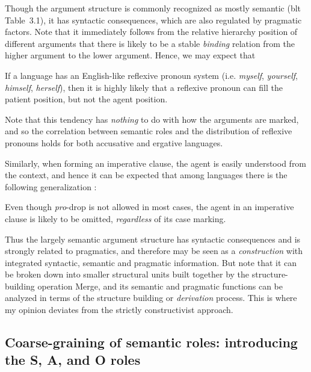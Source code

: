 \documentclass{article}
\newcommand*{\citesec}[1]{\S~{#1}}
\newcommand*{\citetable}[1]{Table~{#1}}
\newcommand*{\term}[1]{\emph{#1}}
\begin{document}
Though the argument structure is commonly recognized as mostly semantic 
(\ac{blt} \citetable{3.1}), 
it has syntactic consequences, which are also regulated by pragmatic factors.
Note that it immediately follows from the relative hierarchy position of different arguments
that there is likely to be a stable \emph{binding} relation from the higher argument to the lower argument.
Hence, we may expect that 
\begin{exe}
    \ex \label{ex:argument-binding} If a language has an English-like reflexive pronoun system
    (i.e. \term{myself}, \term{yourself}, \term{himself}, \term{herself}),
    then it is highly likely that a reflexive pronoun can fill the patient position,
    but not the agent position.
\end{exe}
Note that this tendency has \emph{nothing} to do with how the arguments are marked, 
and so the correlation between semantic roles and the distribution of reflexive pronouns holds 
for both accusative and ergative languages.

Similarly, when forming an imperative clause, 
the agent is easily understood from the context, 
and hence it can be expected that among languages there is the following generalization
\citep[\citesec{5.4}]{comrie1989language}:
\begin{exe}
    \ex \label{ex:argument-imperative} Even though \textit{pro}-drop is not allowed in most cases,
    the agent in an imperative clause is likely to be omitted,
    \emph{regardless} of its case marking.
\end{exe}

Thus the largely semantic argument structure has syntactic consequences and is strongly related to pragmatics,
and therefore may be seen as a \emph{construction} with integrated syntactic, semantic and pragmatic information.
But note that it can be broken down into smaller structural units built together 
by the structure-building operation Merge, 
and its semantic and pragmatic functions can be analyzed 
in terms of the structure building or \emph{derivation} process.
This is where my opinion deviates from the strictly constructivist approach.

\subsection{Coarse-graining of semantic roles: introducing the S, A, and O roles}
\end{document}
